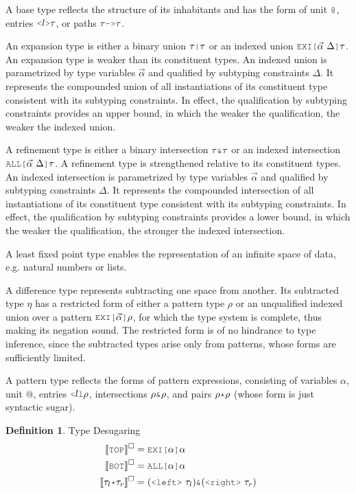 \documentclass[acmsmall]{acmart}
\theoremstyle{definition}
\newtheorem{definition}{Definition}[section]
\begin{document}
A base type reflects the structure of its inhabitants and has the form of unit $\J{@}$, 
entries $\J{<}l\J{>}\tau$, or paths $\tau \J{->} \tau$.

An expansion type is either a binary union $\tau \J{|} \tau$ or 
an indexed union $\J{EXI[}\vec{\alpha}\ \Delta\J{]}\tau$.
An expansion type is weaker than its constituent types. 
An indexed union is parametrized by type variables $\vec{\alpha}$ 
and qualified by subtyping constraints $\Delta$.
It represents the compounded union of all instantiations of its constituent type 
consistent with its subtyping constraints.
In effect, the qualification by subtyping constraints provides an upper bound, in which
the weaker the qualification, the weaker the indexed union.

A refinement type is either a binary intersection $\tau \J{\&} \tau$ or 
an indexed intersection $\J{ALL[} \vec{\alpha}\ \Delta \J{]}\tau$.
A refinement type is strengthened relative to its constituent types. 
An indexed intersection is parametrized by type variables $\vec{\alpha}$ 
and qualified by subtyping constraints $\Delta$.
It represents the compounded intersection of all instantiations of its constituent type 
consistent with its subtyping constraints.
In effect, the qualification by subtyping constraints provides a lower bound, in which
the weaker the qualification, the stronger the indexed intersection.

A least fixed point type enables the representation of an infinite space of data,
e.g. natural numbers or lists. 

A difference type represents subtracting one space from another.
Its subtracted type $\eta$ has a restricted form of either
a pattern type $\rho$ or an unqualified indexed union 
over a pattern $\J{EXI[}\vec{\alpha} \J{]} \rho$, for which the type system
is complete, thus making its negation sound.  
The restricted form is of no hindrance to type inference, since the 
subtracted types arise only from patterns, whose forms are sufficiently
limited.

A pattern type reflects the forms of pattern expressions, consisting of 
variables $\alpha$, unit $@$, entries $\J{<} l \J{l} \rho$, intersections $\rho \J{\&} \rho$,
and pairs $\rho \J{*} \rho$ (whose form is just syntactic sugar).


\hfill
\begin{definition} 
  \label{def:type_desugaring}
  Type Desugaring 
  \hfill 
  \boxed{\llbracket \gamma \rrbracket^\square = \tau}
  \\
  \begin{align*}
    \llbracket \J{TOP} \rrbracket^\square &= \J{EXI[} \alpha \J{]} \alpha
    \\
    \llbracket \J{BOT} \rrbracket^\square &= \J{ALL[} \alpha \J{]} \alpha
    \\
    \llbracket \tau_l \J{*} \tau_r \rrbracket^\square &= (\J{<left>}\ \tau_l)  \J{\&} (\J{<right>}\ \tau_r)
  \end{align*}
\end{definition} 
\hfill
\end{document}
